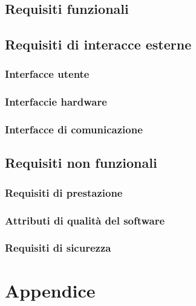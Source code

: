 \documentclass{report}
\begin{document}
\section{Requisiti funzionali}
\section{Requisiti di interacce esterne}
\subsection{Interfacce utente}
\subsection{Interfaccie hardware}
\subsection{Interfacce di comunicazione}
\section{Requisiti non funzionali}
\subsection{Requisiti di prestazione}
\subsection{Attributi di qualità del software}
\subsection{Requisiti di sicurezza}

\chapter{Appendice}
\end{document}
